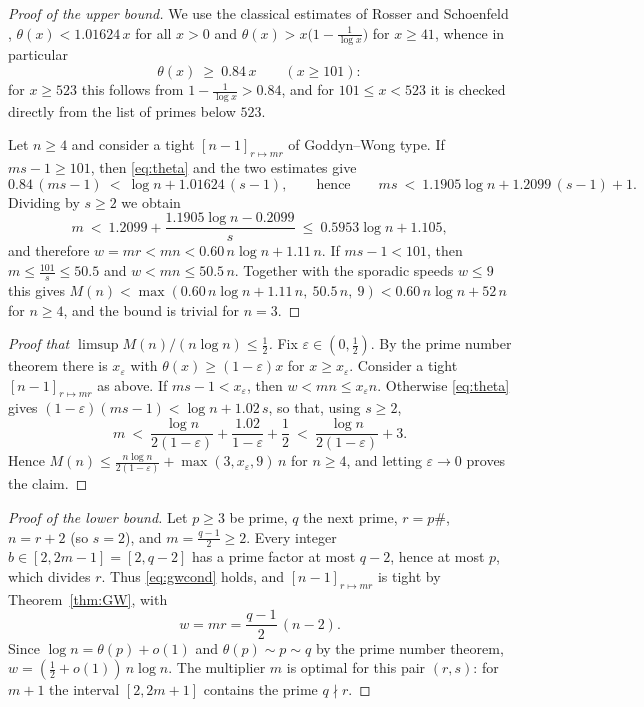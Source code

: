 \documentclass[11pt]{article}
\theoremstyle{definition}
\begin{document}
\begin{proof}[Proof of the upper bound]
We use the classical estimates of Rosser and Schoenfeld \cite{RS62},
$\theta(x)<1.01624\,x$ for all $x>0$ and
$\theta(x)>x\bigl(1-\frac1{\log x}\bigr)$ for $x\ge41$, whence in
particular
\begin{equation}\label{eq:theta084}
\theta(x)\ \ge\ 0.84\,x\qquad(x\ge101):
\end{equation}
for $x\ge523$ this follows from $1-\frac1{\log x}>0.84$, and for
$101\le x<523$ it is checked directly from the list of primes below
$523$.

Let $n\ge4$ and consider a tight $[n-1]_{r\mapsto mr}$ of Goddyn--Wong
type. If $ms-1\ge101$, then \eqref{eq:theta} and the two estimates give
\[
0.84\,(ms-1)\ <\ \log n+1.01624\,(s-1),
\qquad\text{hence}\qquad
ms\ <\ 1.1905\log n+1.2099\,(s-1)+1 .
\]
Dividing by $s\ge2$ we obtain
\[
m\ <\ 1.2099+\frac{1.1905\log n-0.2099}{s}
\ \le\ 0.5953\log n+1.105 ,
\]
and therefore $w=mr<mn<0.60\,n\log n+1.11\,n$. If $ms-1<101$, then
$m\le\frac{101}{s}\le50.5$ and $w<mn\le50.5\,n$. Together with the
sporadic speeds $w\le9$ this gives
$M(n)<\max(0.60\,n\log n+1.11\,n,\ 50.5\,n,\ 9)<0.60\,n\log n+52\,n$
for $n\ge4$, and the bound is trivial for $n=3$.
\end{proof}

\begin{proof}[Proof that $\limsup M(n)/(n\log n)\le\frac12$]
Fix $\varepsilon\in(0,\frac12)$. By the prime number theorem there is
$x_\varepsilon$ with $\theta(x)\ge(1-\varepsilon)x$ for
$x\ge x_\varepsilon$. Consider a tight $[n-1]_{r\mapsto mr}$ as above.
If $ms-1<x_\varepsilon$, then $w<mn\le x_\varepsilon n$. Otherwise
\eqref{eq:theta} gives $(1-\varepsilon)(ms-1)<\log n+1.02\,s$, so that,
using $s\ge2$,
\[
m\ <\ \frac{\log n}{2(1-\varepsilon)}+\frac{1.02}{1-\varepsilon}+\frac12
\ <\ \frac{\log n}{2(1-\varepsilon)}+3 .
\]
Hence
$M(n)\le\frac{n\log n}{2(1-\varepsilon)}+\max(3,x_\varepsilon,9)\,n$ for
$n\ge4$, and letting $\varepsilon\to0$ proves the claim.
\end{proof}

\begin{proof}[Proof of the lower bound]
Let $p\ge3$ be prime, $q$ the next prime, $r=p\#$, $n=r+2$ (so $s=2$),
and $m=\frac{q-1}2\ge2$. Every integer $b\in[2,2m-1]=[2,q-2]$ has a
prime factor at most $q-2$, hence at most $p$, which divides $r$. Thus
\eqref{eq:gwcond} holds, and $[n-1]_{r\mapsto mr}$ is tight by
Theorem~\ref{thm:GW}, with
\[
w=mr=\frac{q-1}2\,(n-2).
\]
Since $\log n=\theta(p)+o(1)$ and $\theta(p)\sim p\sim q$ by the prime
number theorem, $w=(\frac12+o(1))\,n\log n$. The multiplier $m$ is
optimal for this pair $(r,s)$: for $m+1$ the interval $[2,2m+1]$
contains the prime $q\nmid r$.
\end{proof}
\end{document}
